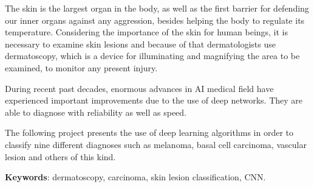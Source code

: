 \onehalfspacing

The skin is the largest organ in the body, as well as the first barrier for defending our inner organs against any aggression, besides helping the body to regulate its temperature. Considering the importance of the skin for human beings, it is necessary to examine skin lesions and because of that dermatologists use dermatoscopy, which is a device for illuminating and magnifying the area to be examined, to monitor any present injury.  

During recent past decades, enormous advances in AI medical field have experienced important improvements due to the use of deep networks. They are able to diagnose with reliability as well as speed. 

The following project presents the use of deep learning algorithms in order to classify nine different diagnoses such as melanoma, basal cell carcinoma, vascular lesion and others of this kind.



\vspace{1.5cm}

\textbf{Keywords}: dermatoscopy, carcinoma, skin lesion classification, CNN.
